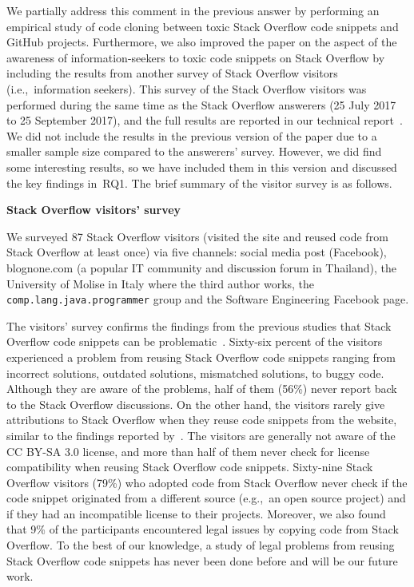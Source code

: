 \documentclass[a4paper,twoside,10pt]{reviewresponse}
\begin{document}
We partially address this comment in the previous answer by performing an
empirical study of code cloning between toxic Stack Overflow code snippets and
GitHub projects. Furthermore, we also improved the paper on the aspect of the
awareness of information-seekers to toxic code snippets on Stack Overflow by
including the results from another survey of Stack Overflow visitors
(i.e.,~information seekers). This survey of the Stack Overflow visitors was
performed during the same time as the Stack Overflow answerers (25 July 2017 to
25 September 2017), and the full results are reported in our technical
report~\citep{Ragkhitwetsagul_RN2017}. We did not include the results in the
previous version of the paper due to a smaller sample size compared to the
answerers' survey. However, we did find some interesting results, so we have
included them in this version and discussed the key findings in~RQ1. The brief
summary of the visitor survey is as follows.

\textbf{Stack Overflow visitors' survey}

We surveyed 87 Stack Overflow visitors (visited the site and reused code from Stack
Overflow at least once) via five channels: social media post (Facebook),
\textsf{blognone.com} (a popular IT community and discussion forum in Thailand),
the University of Molise in Italy where the third author works, the
\texttt{comp.lang.java.programmer} group and the Software Engineering Facebook
page.

The visitors' survey confirms the findings from the previous studies that Stack
Overflow code snippets can be problematic~\citep{Zhang2018,Acar2016,An2017}. Sixty-six
percent of the visitors experienced a problem from reusing Stack Overflow code
snippets ranging from incorrect solutions, outdated solutions, mismatched
solutions, to buggy code. Although they are aware of the problems, half of them
(56\%) never report back to the Stack Overflow discussions. On the other hand,
the visitors rarely give attributions to Stack Overflow when they reuse code
snippets from the website, similar to the findings reported
by~\cite{Baltes2017}. The visitors are generally not aware of the CC BY-SA 3.0
license, and more than half of them never check for license compatibility when
reusing Stack Overflow code snippets. 
Sixty-nine Stack Overflow visitors (79\%) who adopted code from Stack Overflow never 
check if the code snippet originated from a different source (e.g.,~an open source project) 
and if they had an incompatible license to their projects.
Moreover, we also found that 9\% of the participants
encountered legal issues by copying code from Stack Overflow. To the best of our
knowledge, a study of legal problems from reusing Stack Overflow code snippets
has never been done before and will be our future work.
\end{document}

